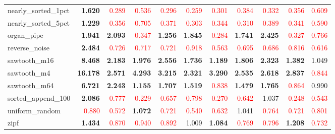 \begin{table}[h]
\begin{tabular}{lrrrrrrrrrr}
nearly\_sorted\_1pct & \textbf{1.620} & \textcolor{red}{0.289} & \textcolor{red}{0.536} & \textcolor{red}{0.296} & \textcolor{red}{0.259} & \textcolor{red}{0.301} & \textcolor{red}{0.384} & \textcolor{red}{0.332} & \textcolor{red}{0.356} & \textcolor{red}{0.609} \\
nearly\_sorted\_5pct & \textbf{1.229} & \textcolor{red}{0.356} & \textcolor{red}{0.705} & \textcolor{red}{0.371} & \textcolor{red}{0.303} & \textcolor{red}{0.344} & \textcolor{red}{0.310} & \textcolor{red}{0.389} & \textcolor{red}{0.341} & \textcolor{red}{0.590} \\
organ\_pipe & \textbf{1.941} & \textbf{2.093} & \textcolor{red}{0.347} & \textbf{1.256} & \textbf{1.845} & \textcolor{red}{0.284} & \textbf{1.741} & \textbf{2.425} & \textcolor{red}{0.327} & \textcolor{red}{0.766} \\
reverse\_noise & \textbf{2.484} & \textcolor{red}{0.726} & \textcolor{red}{0.717} & \textcolor{red}{0.721} & \textcolor{red}{0.918} & \textcolor{red}{0.563} & \textcolor{red}{0.695} & \textcolor{red}{0.686} & \textcolor{red}{0.816} & \textcolor{red}{0.616} \\
sawtooth\_m16 & \textbf{8.468} & \textbf{2.183} & \textbf{1.976} & \textbf{2.556} & \textbf{1.736} & \textbf{1.189} & \textbf{1.806} & \textbf{2.323} & \textbf{1.382} & 1.049 \\
sawtooth\_m4 & \textbf{16.178} & \textbf{2.571} & \textbf{4.293} & \textbf{3.215} & \textbf{2.321} & \textbf{3.290} & \textbf{2.535} & \textbf{2.618} & \textbf{2.837} & \textcolor{red}{0.844} \\
sawtooth\_m64 & \textbf{6.721} & \textbf{2.243} & \textbf{1.155} & \textbf{1.707} & \textbf{1.519} & \textcolor{red}{0.838} & \textbf{1.479} & \textbf{1.765} & \textcolor{red}{0.864} & 0.990 \\
sorted\_append\_100 & \textbf{2.086} & \textcolor{red}{0.777} & \textcolor{red}{0.229} & \textcolor{red}{0.657} & \textcolor{red}{0.798} & \textcolor{red}{0.270} & \textcolor{red}{0.642} & 1.037 & \textcolor{red}{0.248} & \textcolor{red}{0.543} \\
uniform\_random & \textcolor{red}{0.880} & \textcolor{red}{0.572} & \textbf{1.072} & \textcolor{red}{0.721} & \textcolor{red}{0.540} & \textcolor{red}{0.632} & 1.041 & \textcolor{red}{0.764} & \textcolor{red}{0.721} & \textcolor{red}{0.801} \\
zipf & \textbf{1.434} & \textcolor{red}{0.870} & \textcolor{red}{0.940} & \textcolor{red}{0.892} & 1.009 & \textbf{1.084} & \textcolor{red}{0.769} & \textcolor{red}{0.796} & \textbf{1.208} & \textcolor{red}{0.732} \\
\bottomrule
\end{tabular}\end{table}